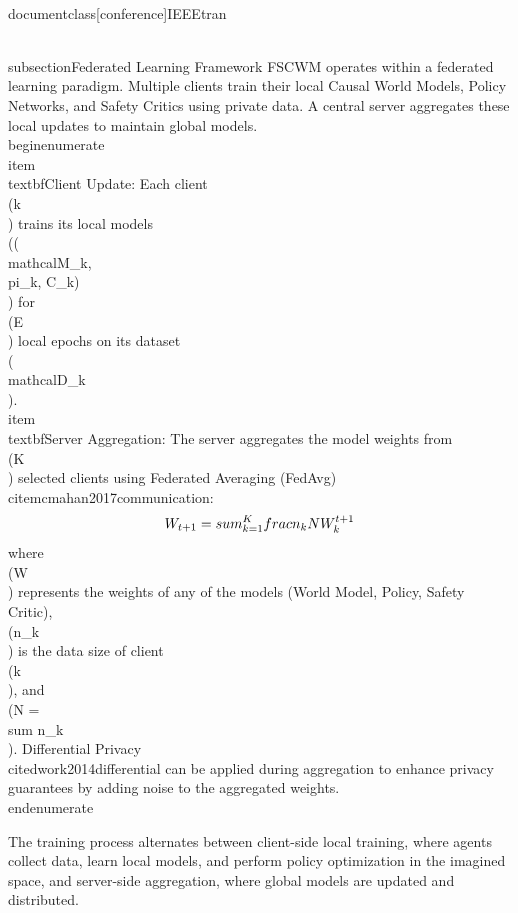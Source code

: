 \\documentclass[conference]{IEEEtran}
\begin{document}
\\subsection{Federated Learning Framework}
FSCWM operates within a federated learning paradigm. Multiple clients train their local Causal World Models, Policy Networks, and Safety Critics using private data. A central server aggregates these local updates to maintain global models.
\\begin{enumerate}
    \\item \\textbf{Client Update}: Each client \\(k\\) trains its local models \\((\\mathcal{M}_k, \\pi_k, C_k)\\) for \\(E\\) local epochs on its dataset \\(\\mathcal{D}_k\\).
    \\item \\textbf{Server Aggregation}: The server aggregates the model weights from \\(K\\) selected clients using Federated Averaging (FedAvg) \\cite{mcmahan2017communication}:
    $$
    W_{t+1} = \\sum_{k=1}^K \\frac{n_k}{N} W_k^{t+1}
    $$
    where \\(W\\) represents the weights of any of the models (World Model, Policy, Safety Critic), \\(n_k\\) is the data size of client \\(k\\), and \\(N = \\sum n_k\\). Differential Privacy \\cite{dwork2014differential} can be applied during aggregation to enhance privacy guarantees by adding noise to the aggregated weights.
\\end{enumerate}

The training process alternates between client-side local training, where agents collect data, learn local models, and perform policy optimization in the imagined space, and server-side aggregation, where global models are updated and distributed.
\end{document}
